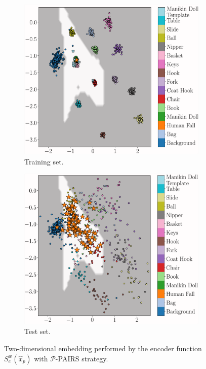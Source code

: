 \begin{figure}[H]
	\centering
	\begin{subfigure}[b]{0.475\textwidth}   
		\centering 
		\includegraphics[width=\textwidth]{img/eeai/embedding/positive_template_pairs_only/fold_4_train}
		\caption[]%
		{Training set.}    
		\label{fig:train-p-pairs}
	\end{subfigure}
	\quad
	\begin{subfigure}[b]{0.475\textwidth}   
		\centering 
		\includegraphics[width=\textwidth]{img/eeai/embedding/positive_template_pairs_only/fold_4_moquette}
		\caption[]%
		{Test set.}    
		\label{fig:test-p-pairs}
	\end{subfigure}
	\caption[]
	{\small Two-dimensional embedding performed by the encoder function $S_e^w(\hat{x}_{p})$ with $\mathcal{P}$-PAIRS strategy.} 
	\label{fig:p-pairs}
\end{figure}


